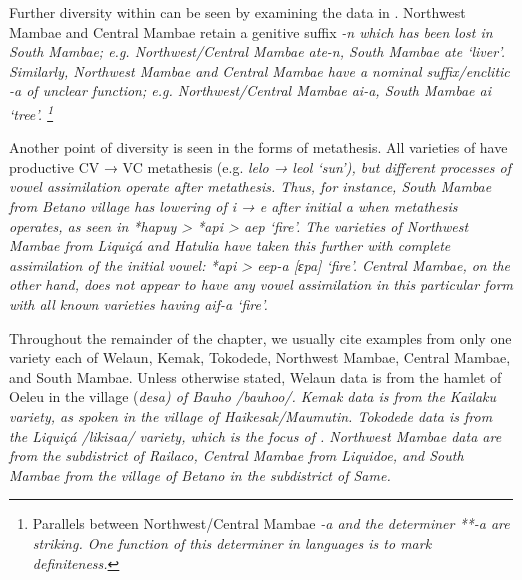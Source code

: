 Further diversity within  can be seen by examining
the data in \citet{Fogaca2017}.
Northwest Mambae and Central Mambae retain a genitive suffix
\it{-n} which has been lost in South Mambae; e.g.
Northwest/Central Mambae \it{ate-n}, South Mambae \it{ate} ‘liver’.
Similarly, Northwest Mambae and Central Mambae have a nominal
suffix/enclitic \it{-a} of unclear function; e.g.
Northwest/Central Mambae \it{ai-a}, South Mambae \it{ai} ‘tree’.
\footnote{
		Parallels between Northwest/Central Mambae \it{-a}
		and the  determiner **-a are striking.
		One function of this determiner in  languages
		is to mark definiteness.}

Another point of diversity is seen in the forms of metathesis.
All varieties of  have productive CV → VC metathesis (e.g.
\it{lelo → leol} ‘sun’),
but different processes of  vowel assimilation operate after metathesis.
Thus, for instance, South Mambae from Betano village has lowering
of \it{i → e} after initial \it{a} when metathesis operates,
as seen in *hapuy > *api > \it{aep} ‘fire’.
The varieties of Northwest Mambae from Liquiçá
and Hatulia have taken this further with complete assimilation
of the initial vowel: *api > \it{eep-a} [ɛpa] ‘fire’.
Central Mambae, on the other hand,
does not appear to have any vowel assimilation in this particular
form with all known varieties having \it{aif-a} ‘fire’.

Throughout the remainder of the chapter,
we usually cite examples from only one variety each of Welaun,
Kemak, Tokodede, Northwest Mambae, Central Mambae, and South Mambae.
Unless otherwise stated, Welaun data is from the hamlet of Oele{\Q}u
in the village (\it{desa}) of Bauho /bauhoo/.
Kemak data is from the Kailaku variety,
as spoken in the village of Haikesak/Maumutin.
Tokodede data is from the Liquiçá /likisaa/ variety, which is
the focus of \citet{LSG2006}.
Northwest Mambae data are from the subdistrict of Railaco,
Central Mambae from Liquidoe,
and South Mambae from the village of Betano in the subdistrict of Same.
